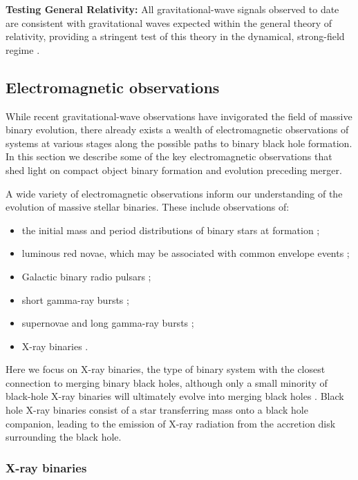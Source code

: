 \documentclass[iop,onecolumn]{revtex4-1}
\begin{document}
\textbf{Testing General Relativity:} All gravitational-wave signals observed to date are consistent with gravitational waves expected within the general theory of relativity, providing a stringent test of this theory in the dynamical, strong-field regime \citep{GW150914:GR,GW170104}.

\subsection{Electromagnetic observations}

While recent gravitational-wave observations have invigorated the field of massive binary evolution, there already exists a wealth of electromagnetic observations of systems at various stages along the possible paths to binary black hole formation. In this section we describe some of the key electromagnetic observations that shed light on compact object binary formation and evolution preceding merger.

A wide variety of electromagnetic observations inform our understanding of the evolution of massive stellar binaries. These include observations of: 
\begin{itemize}
\item the initial mass and period distributions of binary stars at formation \citep[e.g.,][]{Sana:2012,MoeDiStefano:2017}; 
\item luminous red novae, which may be associated with common envelope events \citep[e.g.,][]{Ivanova:2013LRN};
\item Galactic binary radio pulsars \citep[e.g.,][]{Tauris:2017};
\item short gamma-ray bursts \citep[e.g.,][]{Berger:2014};
\item supernovae and long gamma-ray bursts \citep[e.g.,][]{Cantiello:2007,Szecsi:2017};
\item X-ray binaries \citep[e.g.,][]{TaurisvdH:2006}.
\end{itemize}
Here we focus on X-ray binaries, the type of binary system with the closest connection to merging binary black holes, although only a small minority of black-hole X-ray binaries will ultimately evolve into merging black holes \citep[e.g.,][]{CygnusX3:2012}. Black hole X-ray binaries consist of a star transferring mass onto a black hole companion, leading to the emission of X-ray radiation from the accretion disk surrounding the black hole. 

\subsubsection{X-ray binaries}
\end{document}
